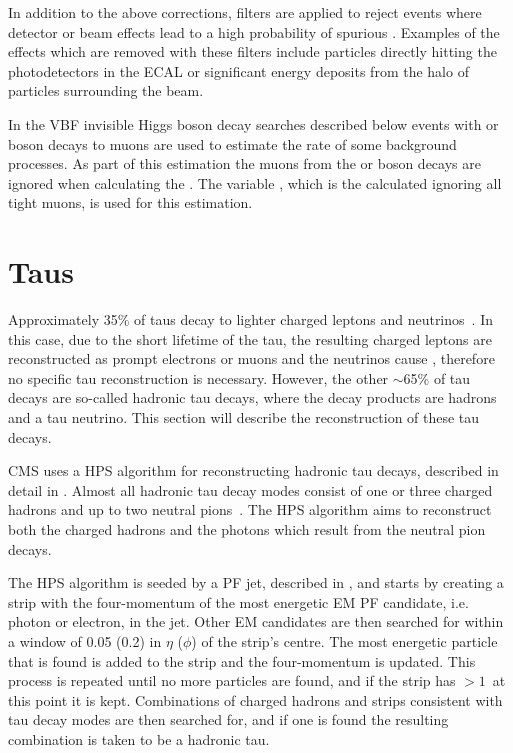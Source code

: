 In addition to the above corrections, filters are applied to reject events where detector or beam effects lead to a high probability of spurious \MET. Examples of the effects which are removed with these filters include particles directly hitting the photodetectors in the \ac{ECAL} or significant energy deposits from the halo of particles surrounding the \LHC beam.

In the \ac{VBF} invisible Higgs boson decay searches described below events with \PW or \PZ boson decays to muons are used to estimate the rate of some background processes. As part of this estimation the muons from the \PW or \PZ boson decays are ignored when calculating the \MET. The variable \METnoMU, which is the \MET calculated ignoring all tight muons, is used for this estimation.
\section{Taus}
\label{sec:taus}
Approximately 35\% of taus decay to lighter charged leptons and neutrinos~\cite{pdg}. In this case, due to the short lifetime of the tau, the resulting charged leptons are reconstructed as prompt electrons or muons and the neutrinos cause \MET, therefore no specific tau reconstruction is necessary. However, the other $\sim$65\% of tau decays are so-called hadronic tau decays, where the decay products are hadrons and a tau neutrino. This section will describe the reconstruction of these tau decays.

CMS uses a \ac{HPS} algorithm for reconstructing hadronic tau decays, described in detail in . Almost all hadronic tau decay modes consist of one or three charged hadrons and up to two neutral pions~\cite{pdg}. The \ac{HPS} algorithm aims to reconstruct both the charged hadrons and the photons which result from the neutral pion decays.

The \ac{HPS} algorithm is seeded by a \ac{PF} jet, described in , and starts by creating a strip with the four-momentum of the most energetic \ac{EM} \ac{PF} candidate, i.e. photon or electron, in the jet. Other \ac{EM} candidates are then searched for within  a window of 0.05 (0.2) in $\eta$ ($\phi$) of the strip's centre. The most energetic particle that is found is added to the strip and the four-momentum is updated. This process is repeated until no more particles are found, and if the strip has \pt$>1$\GeV\, at this point it is kept. Combinations of charged hadrons and strips consistent with tau decay modes are then searched for, and if one is found the resulting combination is taken to be a hadronic tau.

